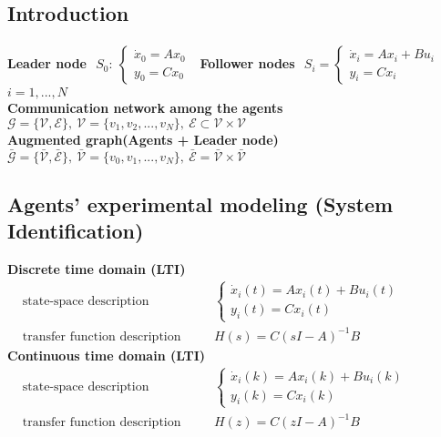 \documentclass[a4paper, 12pt]{article}
\begin{document}
\subsection*{\color{red}Introduction}
\textbf{Leader node} $
    \begin{aligned}
        S_0: \ \begin{cases}
            \dot{x}_0=Ax_0\\
            y_0=Cx_0
        \end{cases}
    \end{aligned}$ \qquad
\textbf{Follower nodes} $\begin{aligned}
    S_i=\begin{cases}
        \dot{x}_i=Ax_i+Bu_i\\
        y_i=Cx_i
    \end{cases}
\end{aligned}$ $i=1,...,N$\\
\textbf{Communication network among the agents}
$\mathcal{G} = \{\mathcal{V}, \mathcal{E}\}, \ \mathcal{V}=\{v_1, v_2, ..., v_N\}, \ 
\mathcal{E} \subset \mathcal{V} \times \mathcal{V}$\\
\textbf{Augmented graph(Agents + Leader node)}
$\bar{\mathcal{G}} = \{
    \bar{\mathcal{V}}, \bar{\mathcal{E}}
\}, \ 
\bar{\mathcal{V}}=\{v_0, v_1, ...,v_N\}, \ 
\bar{\mathcal{E}}=\bar{\mathcal{V}} \times \bar{\mathcal{V}}$

\subsection*{\color{red}Agents' experimental modeling (System Identification)}
\textbf{Discrete time domain (LTI)} 
$\begin{aligned}
    &\text{state-space description} &\quad
    &\begin{cases}
        \dot{x}_i(t)=Ax_i(t)+Bu_i(t)\\
        y_i(t)=Cx_i(t)
    \end{cases}\\
    &\text{transfer function description} &\quad
    &H(s)=C(sI-A)^{-1}B
\end{aligned}$\\
\textbf{Continuous time domain (LTI)}
$\begin{aligned}
    &\text{state-space description} &\quad
    &\begin{cases}
        \dot{x}_i(k)=Ax_i(k)+Bu_i(k)\\
        y_i(k)=Cx_i(k)
    \end{cases}\\
    &\text{transfer function description} &\quad
    &H(z)=C(zI-A)^{-1}B
\end{aligned}$ \\
\end{document}
